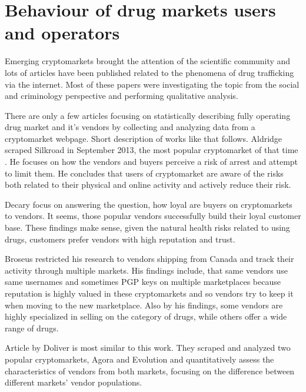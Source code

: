 \documentclass[
  digital, %
  table,   %
  lof,     %
  lot,     %
  oneside
]{fithesis3}
\begin{document}
\section{Behaviour of drug markets users and operators}

Emerging cryptomarkets brought the attention of the scientific community
and lots of articles have been published related to the phenomena of drug trafficking via the internet.
Most of these papers were investigating the topic from the social
and criminology perspective and performing qualitative analysis.
\parencite{aldridge2014not}
\parencite{barratt2014use}
\parencite{christin2013traveling}
\parencite{dolliver2015criminogenic}
\parencite{van2013silk}
\parencite{walsh2011drugs}
\parencite{martin2014lost}

There are only a few articles focusing on statistically describing fully operating drug market and it's vendors
by collecting and analyzing data from a cryptomarket webpage. Short description of works like that follows.
Aldridge \parencite{aldridge2017delivery} scraped Silkroad in September 2013, the most popular cryptomarket of that time
.
He focuses on how the vendors and buyers perceive a risk of arrest and attempt to limit them.
He concludes that users of cryptomarket are aware of the risks both related to their physical and online activity
and actively reduce their risk.

Decary \parencite{decary2017repeat} focus on answering the question, how loyal are buyers on cryptomarkets to vendors. It seems, those popular vendors successfully build their loyal
customer base. These findings make sense, given the natural health risks related to using drugs,
customers prefer vendors with high reputation and trust.

Broseus \parencite{broseus2016studying} restricted his research to vendors shipping from Canada
and track their activity through multiple markets. His findings include, that same vendors
use same usernames and sometimes PGP keys on multiple marketplaces because reputation
is highly valued in these cryptomarkets and so vendors try to keep it when moving to the new marketplace.
Also by his findings, some vendors are highly specialized in selling on the category of drugs, while others offer a wide range of drugs.

Article by Doliver \parencite{dolliver2016characteristics} is most similar to this work.
They scraped and analyzed two popular cryptomarkets, Agora and Evolution and quantitatively assess
the characteristics of vendors from both markets, focusing on the difference
 between different markets' vendor populations.
\end{document}
